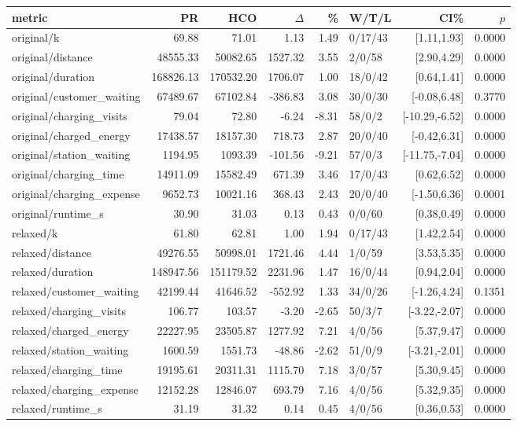 \begin{tabular}{lrrrrlrr}
\toprule
metric & PR & HCO & $\Delta$ & \% & W/T/L & CI\% & $p$ \\
\midrule
original/k & 69.88 & 71.01 & 1.13 & 1.49 & 0/17/43 & [1.11,1.93] & 0.0000 \\
original/distance & 48555.33 & 50082.65 & 1527.32 & 3.55 & 2/0/58 & [2.90,4.29] & 0.0000 \\
original/duration & 168826.13 & 170532.20 & 1706.07 & 1.00 & 18/0/42 & [0.64,1.41] & 0.0000 \\
original/customer_waiting & 67489.67 & 67102.84 & -386.83 & 3.08 & 30/0/30 & [-0.08,6.48] & 0.3770 \\
original/charging_visits & 79.04 & 72.80 & -6.24 & -8.31 & 58/0/2 & [-10.29,-6.52] & 0.0000 \\
original/charged_energy & 17438.57 & 18157.30 & 718.73 & 2.87 & 20/0/40 & [-0.42,6.31] & 0.0000 \\
original/station_waiting & 1194.95 & 1093.39 & -101.56 & -9.21 & 57/0/3 & [-11.75,-7.04] & 0.0000 \\
original/charging_time & 14911.09 & 15582.49 & 671.39 & 3.46 & 17/0/43 & [0.62,6.52] & 0.0000 \\
original/charging_expense & 9652.73 & 10021.16 & 368.43 & 2.43 & 20/0/40 & [-1.50,6.36] & 0.0001 \\
original/runtime_s & 30.90 & 31.03 & 0.13 & 0.43 & 0/0/60 & [0.38,0.49] & 0.0000 \\
relaxed/k & 61.80 & 62.81 & 1.00 & 1.94 & 0/17/43 & [1.42,2.54] & 0.0000 \\
relaxed/distance & 49276.55 & 50998.01 & 1721.46 & 4.44 & 1/0/59 & [3.53,5.35] & 0.0000 \\
relaxed/duration & 148947.56 & 151179.52 & 2231.96 & 1.47 & 16/0/44 & [0.94,2.04] & 0.0000 \\
relaxed/customer_waiting & 42199.44 & 41646.52 & -552.92 & 1.33 & 34/0/26 & [-1.26,4.24] & 0.1351 \\
relaxed/charging_visits & 106.77 & 103.57 & -3.20 & -2.65 & 50/3/7 & [-3.22,-2.07] & 0.0000 \\
relaxed/charged_energy & 22227.95 & 23505.87 & 1277.92 & 7.21 & 4/0/56 & [5.37,9.47] & 0.0000 \\
relaxed/station_waiting & 1600.59 & 1551.73 & -48.86 & -2.62 & 51/0/9 & [-3.21,-2.01] & 0.0000 \\
relaxed/charging_time & 19195.61 & 20311.31 & 1115.70 & 7.18 & 3/0/57 & [5.30,9.45] & 0.0000 \\
relaxed/charging_expense & 12152.28 & 12846.07 & 693.79 & 7.16 & 4/0/56 & [5.32,9.35] & 0.0000 \\
relaxed/runtime_s & 31.19 & 31.32 & 0.14 & 0.45 & 4/0/56 & [0.36,0.53] & 0.0000 \\
\bottomrule
\end{tabular}
